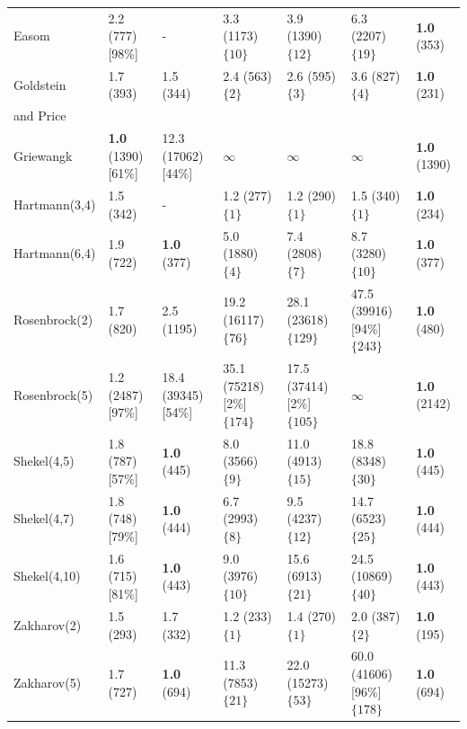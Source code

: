 \documentclass[fontsize=12, a4aper]{scrartcl}
\begin{document}
\begin{table}[H]
\begin{tabularx}{\linewidth}{ l X X X X X X}
			Easom & 2.2 (777) [98\%] & - & 3.3 (1173) \(\{10\}\) & 3.9 (1390) \(\{12\}\) & 6.3 (2207) \(\{19\}\) & \textbf{1.0} (353)\\
			
			Goldstein & 1.7 (393) & 1.5 (344) & 2.4 (563) \(\{2\}\) & 2.6 (595) \(\{3\}\) & 3.6 (827) \(\{4\}\) & \textbf{1.0} (231)\\
			
			and Price & & & & & & \\
			
			Griewangk & \textbf{1.0} (1390) [61\%] & 12.3 (17062) [44\%] & \(\infty\) & \(\infty\) & \(\infty\) & \textbf{1.0} (1390)\\
			
			Hartmann(3,4) & 1.5 (342) & - & 1.2 (277) \(\{1\}\) & 1.2 (290) \(\{1\}\) & 1.5 (340) \(\{1\}\) & \textbf{1.0} (234)\\
			
			Hartmann(6,4) & 1.9 (722) & \textbf{1.0} (377) & 5.0 (1880) \(\{4\}\) & 7.4 (2808) \(\{7\}\) & 8.7 (3280) \(\{10\}\) & \textbf{1.0} (377)\\
			
			Rosenbrock(2) & 1.7 (820) & 2.5 (1195) & 19.2 (16117) \(\{76\}\) & 28.1 (23618) \(\{129\}\) & 47.5 (39916) [94\%] \(\{243\}\) & \textbf{1.0} (480)\\
			
			Rosenbrock(5) & 1.2 (2487) [97\%] & 18.4 (39345) [54\%] & 35.1 (75218) [2\%] \(\{174\}\) & 17.5 (37414) [2\%] \(\{105\}\) & \(\infty\) & \textbf{1.0} (2142)\\
			
			Shekel(4,5) & 1.8 (787) [57\%] & \textbf{1.0} (445) & 8.0 (3566) \(\{9\}\) & 11.0 (4913) \(\{15\}\) & 18.8 (8348) \(\{30\}\) & \textbf{1.0} (445) \\
	
			Shekel(4,7) & 1.8 (748) [79\%] & \textbf{1.0} (444) & 6.7 (2993) \(\{8\}\) & 9.5 (4237) \(\{12\}\) & 14.7 (6523) \(\{25\}\) & \textbf{1.0} (444) \\
			
			Shekel(4,10) & 1.6 (715) [81\%] & \textbf{1.0} (443) & 9.0 (3976) \(\{10\}\) & 15.6 (6913) \(\{21\}\) & 24.5 (10869) \(\{40\}\) & \textbf{1.0} (443) \\
			
			Zakharov(2) & 1.5 (293) & 1.7 (332) & 1.2 (233) \(\{1\}\) & 1.4 (270) \(\{1\}\) & 2.0 (387) \(\{2\}\) & \textbf{1.0} (195) \\
			
			Zakharov(5) & 1.7 (727) & \textbf{1.0} (694) & 11.3 (7853) \(\{21\}\) & 22.0 (15273) \(\{53\}\) & 60.0 (41606) [96\%] \(\{178\}\) & \textbf{1.0} (694)\\
			

\end{tabularx}
\end{table}
\end{document}
